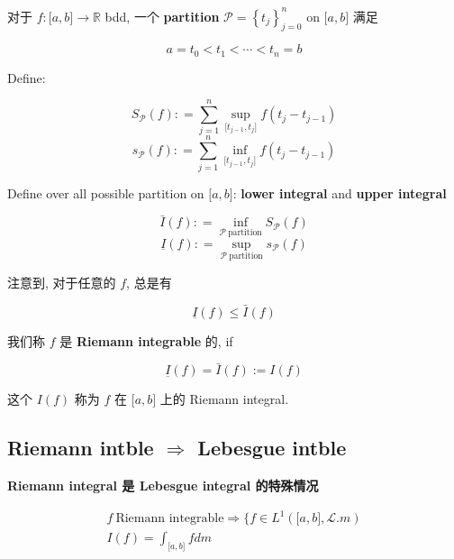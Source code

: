 \documentclass{qlnotes-export}
\begin{document}
\begin{definition}

对于 \(f:\lbrack a,b\rbrack\rightarrow{\mathbb{R}}\) bdd, 一个 \textbf{partition} \(\mathcal{P} = \left\{ t_{j} \right\}_{j = 0}^{n}\) on \(\lbrack a,b\rbrack\) 满足

\[a = t_{0} < t_{1} < \cdots < t_{n} = b\]

Define:

\[S_{\mathcal{P}}(f): = \sum\limits_{j = 1}^{n}\sup\limits_{\lbrack t_{j - 1},t_{j}\rbrack}f(t_{j} - t_{j - 1})\]\[s_{\mathcal{P}}(f): = \sum\limits_{j = 1}^{n}\inf\limits_{\lbrack t_{j - 1},t_{j}\rbrack}f(t_{j} - t_{j - 1})\]

Define over all possible partition on \(\lbrack a,b\rbrack\): \textbf{lower integral} and \textbf{upper integral}

\[\bar{I}(f): = \inf\limits_{\mathcal{P}\ \text{partition}}S_{\mathcal{P}}(f)\]\[\underset{¯}{I}(f): = \sup\limits_{\mathcal{P}\ \text{partition}}s_{\mathcal{P}}(f)\]

注意到, 对于任意的 \(f\), 总是有

\[\underset{¯}{I}(f) \leq \bar{I}(f)\]

我们称 \(f\) 是 \textbf{Riemann integrable} 的, if

\[\underset{¯}{I}(f) = \bar{I}(f) := I(f)\]

这个 \(I(f)\) 称为 \(f\) 在 \(\lbrack a,b\rbrack\) 上的 Riemann integral.

\end{definition}

\subsection{\texorpdfstring{Riemann intble \(\Longrightarrow\) Lebesgue intble}{Riemann intble \textbackslash Longrightarrow Lebesgue intble}}\label{riemann-intble-longrightarrow-lebesgue-intble}

\begin{theorem}{\protect{}\label{kn-riemann-integral-lebesgue-integral}{\textbf{Riemann
integral 是 Lebesgue integral 的特殊情况}}}

\[\begin{matrix}
{f\ \text{Riemann integrable}\Longrightarrow\{ f \in L^{1}(\lbrack a,b\rbrack,\mathcal{L}.m)} \\
{I(f) = \int_{\lbrack a,b\rbrack}f dm}
\end{matrix}\]

\end{theorem}
\end{document}
